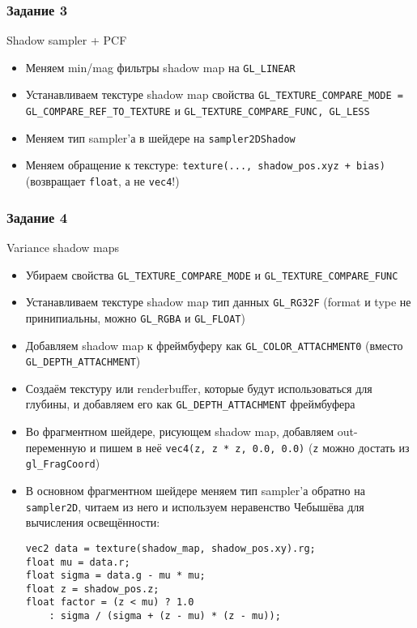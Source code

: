 \documentclass{beamer}
\begin{document}
\begin{frame}[fragile]
\frametitle{Задание 3}
Shadow sampler + PCF
\begin{itemize}
\item Меняем min/mag фильтры shadow map на \verb|GL_LINEAR|
\pause
\item Устанавливаем текстуре shadow map свойства \verb|GL_TEXTURE_COMPARE_MODE = GL_COMPARE_REF_TO_TEXTURE| и \verb|GL_TEXTURE_COMPARE_FUNC, GL_LESS|
\pause
\item Меняем тип sampler'а в шейдере на \verb|sampler2DShadow|
\pause
\item Меняем обращение к текстуре: \verb|texture(..., shadow_pos.xyz + bias)| (возвращает \verb|float|, а не \verb|vec4|!)
\end{itemize}
\end{frame}

\begin{frame}[fragile]
\frametitle{Задание 4}
\fontsize{10pt}{10pt}
Variance shadow maps
\begin{itemize}
\item Убираем свойства \verb|GL_TEXTURE_COMPARE_MODE| и \verb|GL_TEXTURE_COMPARE_FUNC|
\pause
\item Устанавливаем текстуре shadow map тип данных \verb|GL_RG32F| (format и type не принипиальны, можно \verb|GL_RGBA| и \verb|GL_FLOAT|)
\pause
\item Добавляем shadow map к фреймбуферу как \verb|GL_COLOR_ATTACHMENT0| (вместо \verb|GL_DEPTH_ATTACHMENT|)
\pause
\item Создаём текстуру или renderbuffer, которые будут использоваться для глубины, и добавляем его как \verb|GL_DEPTH_ATTACHMENT| фреймбуфера
\pause
\item Во фрагментном шейдере, рисующем shadow map, добавляем out-переменную и пишем в неё \verb|vec4(z, z * z, 0.0, 0.0)| (\verb|z| можно достать из \verb|gl_FragCoord|)
\pause
\item В основном фрагментном шейдере меняем тип sampler'а обратно на \verb|sampler2D|, читаем из него и используем неравенство Чебышёва для вычисления освещённости:
\begin{verbatim}
vec2 data = texture(shadow_map, shadow_pos.xy).rg;
float mu = data.r;
float sigma = data.g - mu * mu;
float z = shadow_pos.z;
float factor = (z < mu) ? 1.0
    : sigma / (sigma + (z - mu) * (z - mu));
\end{verbatim}
\end{itemize}
\end{frame}
\end{document}
